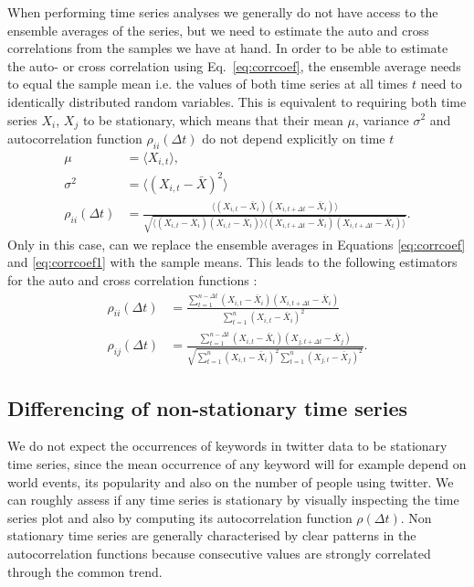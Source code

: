 \documentclass[12pt, a4paper]{article}
\begin{document}
When performing time series analyses we generally do not have access to the ensemble averages of the series, but we need to estimate the auto and cross correlations from the samples we have at hand. In order to be able to estimate the auto- or cross correlation using Eq.~\ref{eq:corrcoef}, the ensemble average needs to equal the sample mean i.e. the values of both time series at all times $t$ need to identically distributed random variables. This is equivalent to requiring both time series $X_{i}$, $X_{j}$ to be stationary, which means that their mean $\mu$, variance $\sigma^{2}$ and autocorrelation function $\rho_{ii}(\Delta t)$ do not depend explicitly on time $t$
\begin{align}
\mu &= \langle X_{i, t} \rangle, \\
\sigma^{2} &=  \langle (X_{i, t}-\bar{X})^{2} \rangle \\
\rho_{ii}(\Delta t) &= \frac{\langle (X_{i, t}-\bar{X}_{i}) (X_{i, t+\Delta t}-\bar{X}_{i}) \rangle}{\sqrt{\langle (X_{i, t}-\bar{X}_{i}) (X_{i, t}-\bar{X}_{i}) \rangle \langle (X_{i, t+\Delta t}-\bar{X}_{i}) (X_{i, t+\Delta t}-\bar{X}_{i}) \rangle}}. 
\end{align} 
Only in this case, can we replace the ensemble averages in Equations \ref{eq:corrcoef} and \ref{eq:corrcoef1} with the sample means. This leads to the following estimators for the auto and cross correlation functions \cite{dettling14}:
\begin{align}
\rho_{ii}(\Delta t) &= \frac{\sum_{t=1}^{n-\Delta t} (X_{i, t}-\bar{X}_{i}) (X_{i, t+\Delta t}-\bar{X}_{i})}{\sum_{t=1}^{n} (X_{i, t}-\bar{X}_{i})^{2}} \\
\rho_{ij}(\Delta t) &= \frac{\sum_{t=1}^{n-\Delta t} (X_{i, t}-\bar{X}_{i}) (X_{j, t+\Delta t}-\bar{X}_{j})}{\sqrt{\sum_{t=1}^{n} (X_{i, t}-\bar{X}_{i})^{2}\sum_{t=1}^{n} (X_{j, t}-\bar{X}_{j})^{2}}}.
\end{align} 

\subsection{Differencing of non-stationary time series}
We do not expect the occurrences of keywords in twitter data to be stationary time series, since the mean occurrence of any keyword will for example depend on world events, its popularity and also on the number of people using twitter. We can roughly assess if any time series is stationary by visually inspecting the time series plot and also by computing its autocorrelation function $\rho(\Delta t)$. Non stationary time series are generally characterised by clear patterns in the autocorrelation functions because consecutive values are strongly correlated through the common trend.
\end{document}

